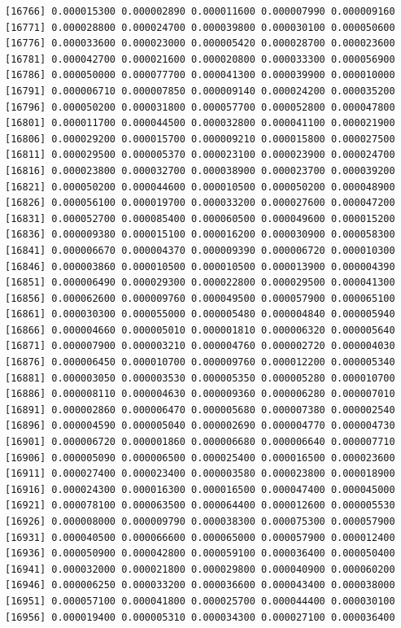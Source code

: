 \documentclass[]{article}
\begin{document}
\begin{verbatim}
[16766] 0.000015300 0.000002890 0.000011600 0.000007990 0.000009160
[16771] 0.000028800 0.000024700 0.000039800 0.000030100 0.000050600
[16776] 0.000033600 0.000023000 0.000005420 0.000028700 0.000023600
[16781] 0.000042700 0.000021600 0.000020800 0.000033300 0.000056900
[16786] 0.000050000 0.000077700 0.000041300 0.000039900 0.000010000
[16791] 0.000006710 0.000007850 0.000009140 0.000024200 0.000035200
[16796] 0.000050200 0.000031800 0.000057700 0.000052800 0.000047800
[16801] 0.000011700 0.000044500 0.000032800 0.000041100 0.000021900
[16806] 0.000029200 0.000015700 0.000009210 0.000015800 0.000027500
[16811] 0.000029500 0.000005370 0.000023100 0.000023900 0.000024700
[16816] 0.000023800 0.000032700 0.000038900 0.000023700 0.000039200
[16821] 0.000050200 0.000044600 0.000010500 0.000050200 0.000048900
[16826] 0.000056100 0.000019700 0.000033200 0.000027600 0.000047200
[16831] 0.000052700 0.000085400 0.000060500 0.000049600 0.000015200
[16836] 0.000009380 0.000015100 0.000016200 0.000030900 0.000058300
[16841] 0.000006670 0.000004370 0.000009390 0.000006720 0.000010300
[16846] 0.000003860 0.000010500 0.000010500 0.000013900 0.000004390
[16851] 0.000006490 0.000029300 0.000022800 0.000029500 0.000041300
[16856] 0.000062600 0.000009760 0.000049500 0.000057900 0.000065100
[16861] 0.000030300 0.000055000 0.000005480 0.000004840 0.000005940
[16866] 0.000004660 0.000005010 0.000001810 0.000006320 0.000005640
[16871] 0.000007900 0.000003210 0.000004760 0.000002720 0.000004030
[16876] 0.000006450 0.000010700 0.000009760 0.000012200 0.000005340
[16881] 0.000003050 0.000003530 0.000005350 0.000005280 0.000010700
[16886] 0.000008110 0.000004630 0.000009360 0.000006280 0.000007010
[16891] 0.000002860 0.000006470 0.000005680 0.000007380 0.000002540
[16896] 0.000004590 0.000005040 0.000002690 0.000004770 0.000004730
[16901] 0.000006720 0.000001860 0.000006680 0.000006640 0.000007710
[16906] 0.000005090 0.000006500 0.000025400 0.000016500 0.000023600
[16911] 0.000027400 0.000023400 0.000003580 0.000023800 0.000018900
[16916] 0.000024300 0.000016300 0.000016500 0.000047400 0.000045000
[16921] 0.000078100 0.000063500 0.000064400 0.000012600 0.000005530
[16926] 0.000008000 0.000009790 0.000038300 0.000075300 0.000057900
[16931] 0.000040500 0.000066600 0.000065000 0.000057900 0.000012400
[16936] 0.000050900 0.000042800 0.000059100 0.000036400 0.000050400
[16941] 0.000032000 0.000021800 0.000029800 0.000040900 0.000060200
[16946] 0.000006250 0.000033200 0.000036600 0.000043400 0.000038000
[16951] 0.000057100 0.000041800 0.000025700 0.000044400 0.000030100
[16956] 0.000019400 0.000005310 0.000034300 0.000027100 0.000036400

\end{verbatim}
\end{document}
